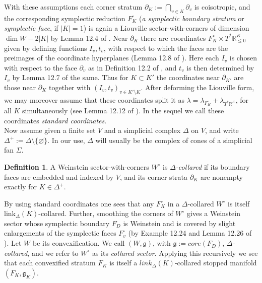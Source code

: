 \documentclass[11pt]{amsart}
\theoremstyle{definition}
\newtheorem{defn}[thm]{Definition}
\theoremstyle{remark}
\numberwithin{equation}{section}
\begin{document}
With these assumptions each corner stratum $\partial_K:=\bigcap_{v\in K}\partial_v$ is coisotropic, and the corresponding symplectic reduction $F^\circ_K$ (\textit{a symplectic boundary stratum} or \textit{symplectic face}, if $|K|=1$) is again a Liouville sector-with-corners of dimension $\dim W-2|K|$ by Lemma 12.4 of \cite{GPSI}. Near $\partial_K$ there are coordinates $F_K^\circ\times T^*\mathbb{R}^K_{\le 0}$ given by defining functions $I_v, t_v$, with respect to which the faces are the preimages of the coordinate hyperplanes (Lemma 12.8 of \cite{GPSI}). Here each $I_v$ is chosen with respect to the face $\partial_v$ as in Definition 12.2 of \cite{GPSI}, and $t_v$ is then determined by $I_v$ by Lemma 12.7 of the same. Thus for $K\subset K'$ the coordinates near $\partial_{K'}$ are those near $\partial_K$ together with $(I_v,t_v)_{v\in K'\setminus K}$. After deforming the Liouville form, we may moreover assume that these coordinates split it as $\lambda=\lambda_{F_K^\circ}+\lambda_{T^*\mathbb{R}^K}$, for all $K$ simultaneously (see Lemma 12.12 of \cite{GPSI}). In the sequel we call these coordinates \textit{standard coordinates}.\\

Now assume given a finite set $V$ and a simplicial complex $\Delta$ on $V$, and write $\Delta^+:=\Delta\setminus\{\varnothing\}$. In our use, $\Delta$ will usually be the complex of cones of a simplicial fan $\Sigma$.

\begin{defn}\label{collared}
A Weinstein sector-with-corners $W^\circ$ is \textit{$\Delta$-collared} if its boundary faces are embedded and indexed by $V$, and its corner strata $\partial_K$ are nonempty exactly for $K\in\Delta^+$.
\end{defn}

By using standard coordinates one sees that any $F_K^\circ$ in a $\Delta$-collared $W^\circ$ is itself $\mathrm{link}_\Delta(K)$-collared. Further, smoothing the corners of $W^\circ$ gives a Weinstein sector whose symplectic boundary $F_D$ is Weinstein and is covered by slight enlargements of the symplectic faces $F_v^\circ$ (by Example 12.24 and Lemma 12.26 of \cite{GPSI}). Let $W$ be its convexification. We call $(W,\mathfrak g)$, with $\mathfrak g:=core(F_D)$, \textit{$\Delta$-collared}, and we refer to $W^\circ$ as its \textit{collared sector}. Applying this recursively we see that each convexified stratum $F_K$ is itself a $link_\Delta(K)$-collared stopped manifold $(F_K,\mathfrak g_K)$.\\
\end{document}
